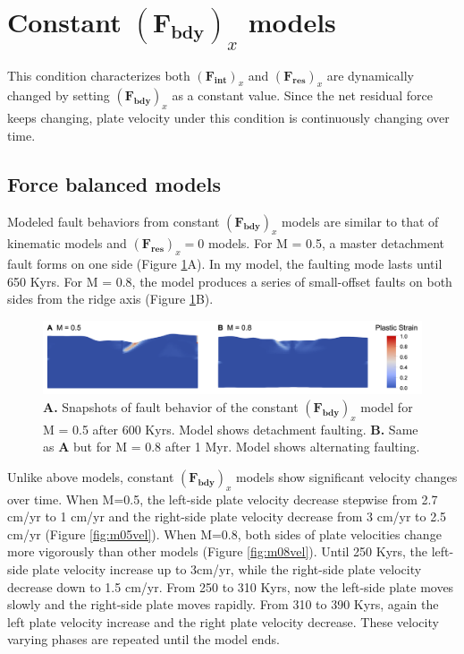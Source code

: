\documentclass[letterpaper,12pt,notitle]{memphisthesis}                     %
\begin{document}
\section{Constant $(\boldsymbol{F_{bdy}})_x$ models}

This condition characterizes both $(\boldsymbol{F_{int}})_x$ and $(\boldsymbol{F_{res}})_x$ are dynamically changed by setting $(\boldsymbol{F_{bdy}})_x$ as a constant value. Since the net residual force keeps changing, plate velocity under this condition is continuously changing over time.

\subsection{Force balanced models}

Modeled fault behaviors from constant $(\boldsymbol{F_{bdy}})_x$ models are similar to that of kinematic models and  $(\boldsymbol{F_{res}})_x = 0$  models. For M = 0.5, a master detachment fault forms on one side (Figure \ref{fig:fbfault}A). In my model, the  faulting mode lasts until 650 Kyrs. For M = 0.8, the model produces a series of small-offset faults on both sides from the ridge axis (Figure \ref{fig:fbfault}B).

\begin{figure}[!htb]
	\centering
	\includegraphics[width=0.99\linewidth]{./figs/fbfault.png}
	\caption{\textbf{A.} Snapshots of fault behavior of the constant $(\boldsymbol{F_{bdy}})_x$ model for M = 0.5 after 600 Kyrs. Model shows detachment faulting. \textbf{B.} Same as \textbf{A} but for M = 0.8 after 1 Myr. Model shows alternating faulting.}
	\label{fig:fbfault}
\end{figure}

Unlike above models, constant $(\boldsymbol{F_{bdy}})_x$ models show significant velocity changes over time. 
When M=0.5, the left-side plate velocity decrease stepwise from 2.7 cm/yr to 1 cm/yr and the right-side plate velocity decrease from 3 cm/yr to 2.5 cm/yr (Figure \ref{fig:m05vel}).
When M=0.8, both sides of plate velocities change more vigorously than other models (Figure \ref{fig:m08vel}). Until 250 Kyrs, the left-side plate velocity increase up to 3cm/yr, while the right-side plate velocity decrease down to 1.5 cm/yr. From 250 to 310 Kyrs, now the left-side plate moves slowly and the right-side plate moves rapidly. From 310 to 390 Kyrs, again the left plate velocity increase and the right plate velocity decrease. These velocity varying phases are repeated until the model ends.
\end{document}
